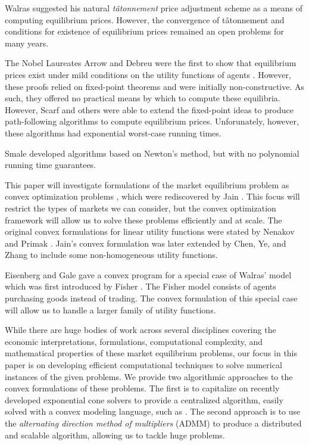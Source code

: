\documentclass[12pt]{article}
\newcommand{\tatonnement}{t\^atonnement}
\begin{document}
Walras suggested his natural \emph{\tatonnement{}} price adjustment scheme as a
means of computing equilibrium prices. However, the convergence of
\tatonnement{} and conditions for existence of equilibrium prices remained an
open problems for many years.

The Nobel Laureates Arrow and Debreu were the first to show that equilibrium
prices exist under mild conditions on the utility functions of agents
\cite{arrow1954existence}. However, these proofs relied on fixed-point theorems
\cite[see][]{border1989fixed}
and were initially non-constructive.
As such, they offered no practical means by which to compute these equilibria. 
However, Scarf and others 
\cite{scarf1967approximation,scarf1973computation,
scarf1982computation,eaves1972homotopies} were able to extend the fixed-point
ideas to produce path-following algorithms to compute equilibrium prices.
Unforunately, however, these algorithms had exponential worst-case running times.

Smale \cite{smale1976exchange,smale1976convergent} developed algorithms based
on Newton's method, but with no polynomial running time guarantees.

This paper will investigate formulations of the market equilibrium
problem as convex optimization problems \cite{BoV:04},
which were rediscovered by Jain \cite{jain2007polynomial}.
This focus will restrict the types of markets we can
consider, but the convex optimization framework will allow us to solve
these problems efficiently and at scale.
The original convex
formulations for linear utility functions
were stated by Nenakov
and Primak \cite{nenakov1983algorithm}. Jain's convex formulation was later
extended by Chen, Ye, and Zhang \cite{chen2007note, chen2010equilibrium} to
include some non-homogeneous utility functions.

Eisenberg and Gale \cite{eisenberg1959consensus, gale1960theory,
eisenberg1961aggregation} gave a convex program for a special case of Walras'
model which was first introduced by Fisher \cite[see][]{brainard2000compute}.
The Fisher model consists of agents purchasing goods instead of trading.
The convex formulation of this special case will allow us to handle a larger
family of utility functions.

While there are huge bodies of work across several disciplines covering the
economic interpretations, formulations, computational complexity, and
mathematical properties of these market equilibrium problems, our focus in
this paper is on developing efficient computational techniques to solve
numerical instances of the given problems.
We provide two algorithmic approaches to the convex formulations
of these problems. The first is to capitalize on recently
developed exponential cone solvers \cite{scs} to provide a centralized
algorithm, easily solved with a convex modeling language, such as \cite{cvxpy,
cvx}. The second approach is to use the \emph{alternating direction method of
multipliers} (ADMM) \cite{boyd2011distributed} to produce a distributed and
scalable algorithm, allowing us to tackle huge problems.
\end{document}
